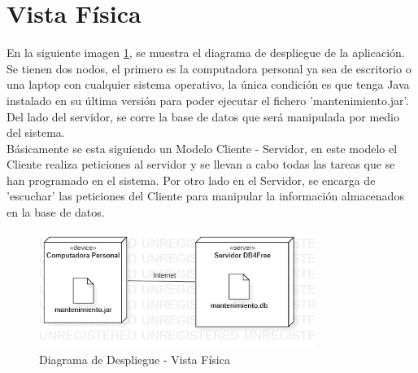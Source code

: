 \section{Vista Física}
En la siguiente imagen \ref{fig:Diagrama de Despliegue - Vista Física}, se muestra el diagrama de despliegue de la aplicación. Se tienen dos nodos, el primero es la computadora personal ya sea de escritorio o una laptop con cualquier sistema operativo, la única condición es que tenga Java instalado en su última versión para poder ejecutar el fichero 'mantenimiento.jar'. Del lado del servidor, se corre la base de datos que será manipulada por medio del sistema. 
\\
Básicamente se esta siguiendo un Modelo Cliente - Servidor, en este modelo el Cliente realiza peticiones al servidor y se llevan a cabo todas las tareas que se han programado en el sistema. Por otro lado en el Servidor, se encarga de 'escuchar' las peticiones del Cliente para manipular la información almacenados en la base de datos.
\begin{figure}[!h]
	\centering
	\includegraphics[width=0.8\textwidth]{./diseno/vfisica/imagenes/vistaFisica}
	\caption{Diagrama de Despliegue - Vista Física}
	\label{fig:Diagrama de Despliegue - Vista Física}
\end{figure}